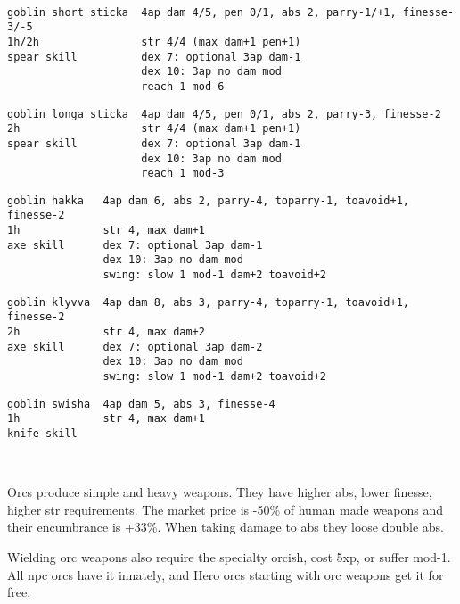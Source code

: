 \

\small \begin{samepage} \begin{verbatim}
goblin short sticka  4ap dam 4/5, pen 0/1, abs 2, parry-1/+1, finesse-3/-5
1h/2h                str 4/4 (max dam+1 pen+1)
spear skill          dex 7: optional 3ap dam-1
                     dex 10: 3ap no dam mod
                     reach 1 mod-6
\end{verbatim} \blocklistgap \begin{verbatim}
goblin longa sticka  4ap dam 4/5, pen 0/1, abs 2, parry-3, finesse-2
2h                   str 4/4 (max dam+1 pen+1)
spear skill          dex 7: optional 3ap dam-1
                     dex 10: 3ap no dam mod
                     reach 1 mod-3
\end{verbatim} \blocklistgap \begin{verbatim}
goblin hakka   4ap dam 6, abs 2, parry-4, toparry-1, toavoid+1, finesse-2
1h             str 4, max dam+1
axe skill      dex 7: optional 3ap dam-1
               dex 10: 3ap no dam mod
               swing: slow 1 mod-1 dam+2 toavoid+2
\end{verbatim} \blocklistgap \begin{verbatim}
goblin klyvva  4ap dam 8, abs 3, parry-4, toparry-1, toavoid+1, finesse-2
2h             str 4, max dam+2
axe skill      dex 7: optional 3ap dam-2
               dex 10: 3ap no dam mod
               swing: slow 1 mod-1 dam+2 toavoid+2
\end{verbatim} \blocklistgap \begin{verbatim}
goblin swisha  4ap dam 5, abs 3, finesse-4
1h             str 4, max dam+1
knife skill
\end{verbatim} \end{samepage} \normalsize \goodbreak

\


\goodbreak
\noindent Orcs produce simple and heavy weapons. They have higher abs, lower finesse, higher str requirements. The market price is -50\% of human made weapons and their encumbrance is +33\%. When taking damage to abs they loose double abs.

Wielding orc weapons also require the specialty orcish, cost 5xp, or suffer mod-1.
All npc orcs have it innately, and Hero orcs starting with orc weapons get it for free.

\

